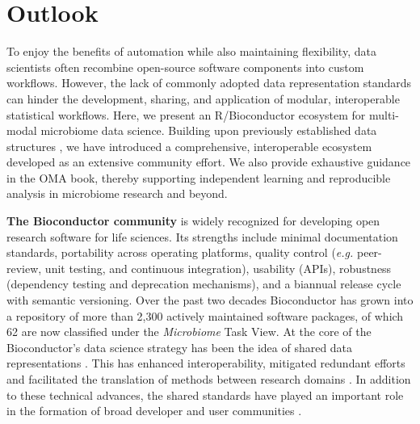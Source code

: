 \documentclass[
  sn-nature,
]{sn-jnl}
\begin{document}
\section{Outlook}\label{sec-discussion}

To enjoy the benefits of automation while also maintaining flexibility,
data scientists often recombine open-source software components into
custom workflows. However, the lack of commonly adopted data
representation standards can hinder the development, sharing, and
application of modular, interoperable statistical workflows. Here, we
present an R/Bioconductor ecosystem for multi-modal microbiome data
science. Building upon previously established data structures
\citep{huang2021, ramos2017}, we have introduced a comprehensive,
interoperable ecosystem developed as an extensive community effort. We
also provide exhaustive guidance in the OMA book, thereby supporting
independent learning and reproducible analysis in microbiome research
and beyond.

\textbf{The Bioconductor community} is widely recognized for developing
open research software for life sciences. Its strengths include minimal
documentation standards, portability across operating platforms, quality
control (\emph{e.g.} peer-review, unit testing, and continuous
integration), usability (APIs), robustness (dependency testing and
deprecation mechanisms), and a biannual release cycle with semantic
versioning. Over the past two decades Bioconductor has grown into a
repository of more than 2,300 actively maintained software packages, of
which 62 are now classified under the \emph{Microbiome} Task View. At
the core of the Bioconductor's data science strategy has been the idea
of shared data representations \citep{gentleman2004, lawrence2013}. This
has enhanced interoperability, mitigated redundant efforts and
facilitated the translation of methods between research domains
\citep{delia2023, barker2022}. In addition to these technical advances,
the shared standards have played an important role in the formation of
broad developer and user communities \citep{drnevich2025}.
\end{document}

